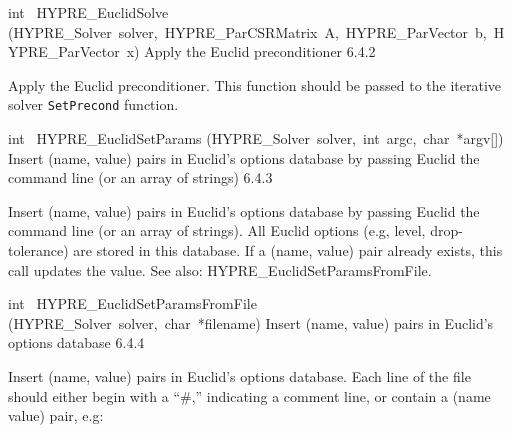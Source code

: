 \documentclass{article}
\begin{document}
\begin{cxxentry}
\begin{cxxentry}
\begin{cxxfunction}
\begin{cxxdoc}
\end{cxxdoc}
\end{cxxfunction}
\begin{cxxfunction}
{int\ }
        {HYPRE\_EuclidSolve}
        {(HYPRE\_Solver\ solver,\ HYPRE\_ParCSRMatrix\ A,\ HYPRE\_ParVector\ b,\ HYPRE\_ParVector\ x)}
        {
Apply the Euclid preconditioner}
        {6.4.2}
\begin{cxxdoc}

Apply the Euclid preconditioner. This function should be passed
to the iterative solver {\tt SetPrecond} function.


\end{cxxdoc}
\end{cxxfunction}
\begin{cxxfunction}
{int\ }
        {HYPRE\_EuclidSetParams}
        {(HYPRE\_Solver\ solver,\ int\ argc,\ char\ *argv[])}
        {
Insert (name, value) pairs in Euclid's options database
by passing Euclid the command line (or an array of strings)}
        {6.4.3}
\begin{cxxdoc}

Insert (name, value) pairs in Euclid's options database
by passing Euclid the command line (or an array of strings).
All Euclid options (e.g, level, drop-tolerance) are stored in
this database.  
If a (name, value) pair already exists, this call updates the value.
See also: HYPRE\_EuclidSetParamsFromFile.


\end{cxxdoc}
\end{cxxfunction}
\begin{cxxfunction}
{int\ }
        {HYPRE\_EuclidSetParamsFromFile}
        {(HYPRE\_Solver\ solver,\ char\ *filename)}
        {
Insert (name, value) pairs in Euclid's options database}
        {6.4.4}
\begin{cxxdoc}

Insert (name, value) pairs in Euclid's options database.
Each line of the file should either begin with a ``\#,''
indicating a comment line, or contain a (name value)
pair, e.g: \\


\end{cxxdoc}
\end{cxxfunction}
\end{cxxentry}
\end{cxxentry}
\end{document}
